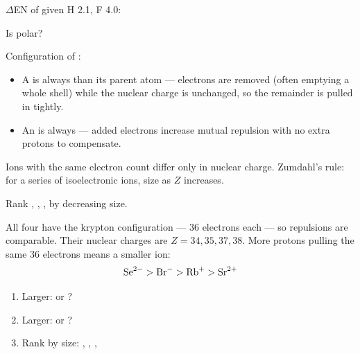 \documentclass{apchem-notes}
\begin{document}

\begin{warmup}[3]
  \item $\Delta$EN of  given H 2.1, F 4.0:
  \item Is  polar? 
  \item Configuration of : \answerblank[2.6cm]{$[\ce{Ar}]$}
\end{warmup}



\begin{itemize}[leftmargin=*,itemsep=0.25em]
  \item A  is always  than its parent
        atom --- electrons are removed (often emptying a whole shell) while
        the nuclear charge is unchanged, so the remainder is pulled in
        tightly.
  \item An  is always  --- added
        electrons increase mutual repulsion with no extra protons to
        compensate.
\end{itemize}


Ions with the same electron count differ only in nuclear charge. Zumdahl's
rule: for a series of isoelectronic ions, size
 as $Z$ increases.

\begin{workedexample}
Rank , , ,  by decreasing size.

All four have the krypton configuration --- 36 electrons each --- so
repulsions are comparable. Their nuclear charges are $Z = 34, 35, 37, 38$.
More protons pulling the same 36 electrons means a smaller ion:
\[ \ce{Se^2-} > \ce{Br-} > \ce{Rb+} > \ce{Sr^2+} \]
\end{workedexample}


\begin{enumerate}[leftmargin=*,itemsep=0.3em]
  \item Larger:  or ? 
  \item Larger:  or ? 
  \item Rank by size: , , , 
\end{enumerate}
\end{document}
